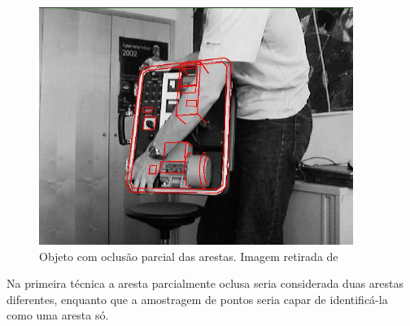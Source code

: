 \begin{figure}[ht!]
\centering
\includegraphics{monografia/occlusion.png}
\caption{Objeto com oclusão parcial das arestas. Imagem retirada de \cite{wuest}}
\label{occlusion}
\end{figure}

Na primeira técnica a aresta parcialmente oclusa seria considerada duas arestas diferentes, enquanto que a amostragem de pontos seria capar de identificá-la como uma aresta só.

